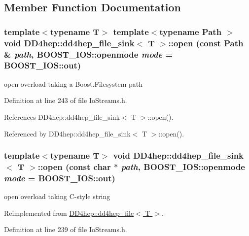\subsection{Member Function Documentation}
\hypertarget{class_d_d4hep_1_1dd4hep__file__sink_a0bce86bdf11e60fc99a0ac32579bee36}{
\subsubsection[{open}]{\setlength{\rightskip}{0pt plus 5cm}template$<$typename T$>$ template$<$typename Path $>$ void {\bf DD4hep::dd4hep\_\-file\_\-sink}$<$ {\bf T} $>$::open (const {\bf Path} \& {\em path}, \/  BOOST\_\-IOS::openmode {\em mode} = {\ttfamily BOOST\_\-IOS::out})}}
\label{class_d_d4hep_1_1dd4hep__file__sink_a0bce86bdf11e60fc99a0ac32579bee36}


open overload taking a Boost.Filesystem path 

Definition at line 243 of file IoStreams.h.

References DD4hep::dd4hep\_\-file\_\-sink$<$ T $>$::open().

Referenced by DD4hep::dd4hep\_\-file\_\-sink$<$ T $>$::open().\hypertarget{class_d_d4hep_1_1dd4hep__file__sink_aae7af8ee1e98ae89b380ddf2dc3f51f9}{
\subsubsection[{open}]{\setlength{\rightskip}{0pt plus 5cm}template$<$typename T$>$ void {\bf DD4hep::dd4hep\_\-file\_\-sink}$<$ {\bf T} $>$::open (const char $\ast$ {\em path}, \/  BOOST\_\-IOS::openmode {\em mode} = {\ttfamily BOOST\_\-IOS::out})}}
\label{class_d_d4hep_1_1dd4hep__file__sink_aae7af8ee1e98ae89b380ddf2dc3f51f9}


open overload taking C-\/style string 

Reimplemented from \hyperlink{class_d_d4hep_1_1dd4hep__file_a44e65364ed22ce152f237541e0391dcc}{DD4hep::dd4hep\_\-file$<$ T $>$}.

Definition at line 239 of file IoStreams.h.

